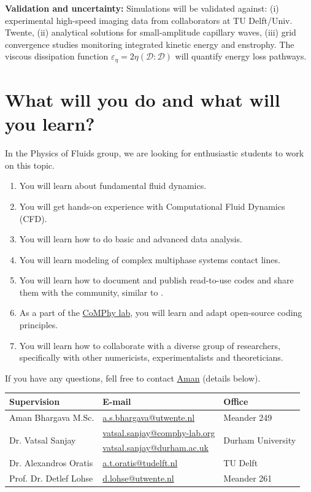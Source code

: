 \documentclass[a4paper,10pt]{article}
\begin{document}
\noindent \textbf{Validation and uncertainty:} Simulations will be validated against: (i) experimental high-speed imaging data from collaborators at TU Delft/Univ. Twente, (ii) analytical solutions for small-amplitude capillary waves, (iii) grid convergence studies monitoring integrated kinetic energy and enstrophy. The viscous dissipation function $\varepsilon_\eta = 2\eta\left(\boldsymbol{\mathcal{D}:\mathcal{D}}\right)$ will quantify energy loss pathways.

\section*{What will you do and what will you learn?}
In the Physics of Fluids group, we are looking for enthusiastic students to work on this topic.
\begin{enumerate}
\itemsep0em
\item You will learn about fundamental fluid dynamics.
\item You will get hands-on experience with Computational Fluid Dynamics (CFD).
\item You will learn how to do basic and advanced data analysis.
\item You will learn modeling of complex multiphase systems contact lines. 
\item You will learn how to document and publish read-to-use codes and share them with the community, similar to \citet{basiliskVatsal, basiliskVatsalDropFilm, basiliskVatsalViscousBouncing}. 
\item As a part of the \href{https://comphy-lab.org}{CoMPhy lab}, you will learn and adapt open-source coding principles. 
\item You will learn how to collaborate with a diverse group of researchers, specifically with other numericists, experimentalists and theoreticians.
\end{enumerate}

If you have any questions, fell free to contact \href{mailto:a.s.bhargava@utwente.nl}{Aman} (details below).
\begin{center}
\begin{tabular}{|l|l|l|}
\hline \textbf{Supervision} & \textbf{E-mail} & \textbf{Office} \\
\hline Aman Bhargava M.Sc. & \href{mailto:a.s.bhargava@utwente.nl}{a.s.bhargava@utwente.nl} & Meander 249 \\
\hline \multirow{2}{*}{Dr. Vatsal Sanjay} & \href{mailto:vatsal.sanjay@comphy-lab.org}{vatsal.sanjay@comphy-lab.org} & \multirow{2}{*}{Durham University} \\
& \href{mailto:vatsal.sanjay@durham.ac.uk}{vatsal.sanjay@durham.ac.uk} & \\
\hline Dr. Alexandros Oratis   & \href{mailto:a.t.oratis@tudelft.nl}{a.t.oratis@tudelft.nl}& TU Delft \\
\hline Prof. Dr. Detlef Lohse & \href{mailto:d.lohse@utwente.nl}{d.lohse@utwente.nl} & Meander 261  \\
\hline
\end{tabular}
\end{center}

\printbibliography
\end{document}
